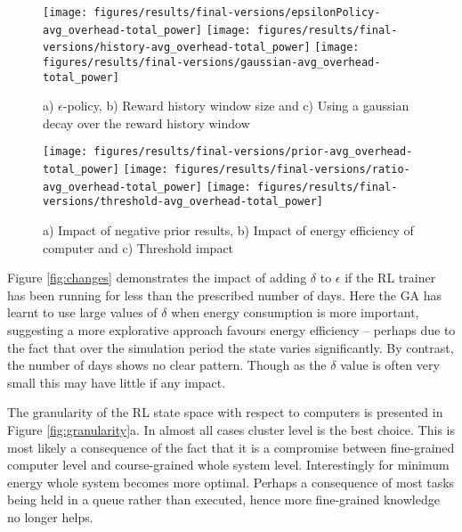 \documentclass[10pt, conference, compsocconf]{IEEEtran}
\begin{document}
%
%
%
\begin{figure*}[!t]
  \texttt{[image: figures/results/final-versions/epsilonPolicy-avg\_overhead-total\_power]}
\hfil
\texttt{[image: figures/results/final-versions/history-avg\_overhead-total\_power]}
\hfil
\texttt{[image: figures/results/final-versions/gaussian-avg\_overhead-total\_power]}
\vskip -9pt
  \caption{a) $\epsilon$-policy, b) Reward history window size and c) Using a gaussian decay over the reward history window}
  \vskip -8pt
  \label{fig:gaussian}
\end{figure*}
\begin{figure*}[!t]
\texttt{[image: figures/results/final-versions/prior-avg\_overhead-total\_power]}
\texttt{[image: figures/results/final-versions/ratio-avg\_overhead-total\_power]}
\hfil
\texttt{[image: figures/results/final-versions/threshold-avg\_overhead-total\_power]}
\vskip -6pt
  \caption{a) Impact of negative prior results, b) Impact of energy efficiency of computer and  c) Threshold impact}
  \label{fig:threshold}
  \vskip -9pt
\end{figure*}

Figure \ref{fig:changes} demonstrates the impact of adding $\delta$ to $\epsilon$ if the RL trainer has been running for less than the prescribed number of days. Here the GA has learnt to use large values of $\delta$ when energy consumption is more important, suggesting a more explorative approach favours energy efficiency -- perhaps due to the fact that over the simulation period the state varies significantly. By contrast, the number of days shows no clear pattern. Though as the $\delta$ value is often very small this may have little if any impact.

The granularity of the RL state space with respect to computers is presented in Figure \ref{fig:granularity}a. In almost all cases cluster level is the best choice. This is most likely a consequence of the fact that it is a compromise between fine-grained computer level and course-grained whole system level. Interestingly for minimum energy whole system becomes more optimal. Perhaps a consequence of most tasks being held in a queue rather than executed, hence more fine-grained knowledge no longer helps.
\end{document}
